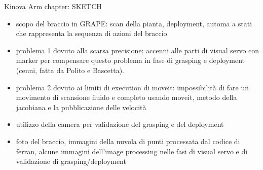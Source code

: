 Kinova Arm chapter: SKETCH
\begin{itemize}
	\item scopo del braccio in GRAPE: scan della pianta, deployment, automa a stati che rappresenta la sequenza di azioni del braccio 
	\item problema 1 dovuto alla scarsa precisione: accenni alle parti di visual servo con marker per compensare questo problema in fase di grasping e deployment (cenni, fatta da Polito e Bascetta).
	\item problema 2 dovuto ai limiti di execution di moveit: impossibilità di fare un movimento di scansione fluido e completo usando moveit, metodo della jacobiana e la pubblicazione delle velocità
	\item utilizzo della camera per validazione del grasping e del deployment
	\item foto del braccio, immagini della nuvola di punti processata dal codice di ferran, alcune immagini dell'image processing nelle fasi di visual servo e di validazione di grasping/deployment
\end{itemize}




